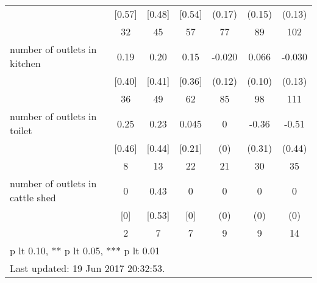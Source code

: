 \begin{table}[htbp]
\begin{tabular*}{1\hsize}{@{\hskip\tabcolsep\extracolsep\fill}l*{1}{cccccc}}
                                &   [0.57]&   [0.48]&   [0.54]&   (0.17)         &   (0.15)         &   (0.13)         \\
                                &       32&       45&       57&       77         &       89         &      102         \\
number of outlets in kitchen    &     0.19&     0.20&     0.15&   -0.020         &    0.066         &   -0.030         \\
                                &   [0.40]&   [0.41]&   [0.36]&   (0.12)         &   (0.10)         &   (0.13)         \\
                                &       36&       49&       62&       85         &       98         &      111         \\
number of outlets in toilet     &     0.25&     0.23&    0.045&        0         &    -0.36         &    -0.51         \\
                                &   [0.46]&   [0.44]&   [0.21]&      (0)         &   (0.31)         &   (0.44)         \\
                                &        8&       13&       22&       21         &       30         &       35         \\
number of outlets in cattle shed&        0&     0.43&        0&        0         &        0         &        0         \\
                                &      [0]&   [0.53]&      [0]&      (0)         &      (0)         &      (0)         \\
                                &        2&        7&        7&        9         &        9         &       14         \\
\bottomrule
\multicolumn{7}{l}{\footnotesize * p lt 0.10, ** p lt 0.05, *** p lt 0.01}\\
\multicolumn{7}{l}{\footnotesize Last updated: 19 Jun 2017 20:32:53.}\\
\end{tabular*}
\end{table}
